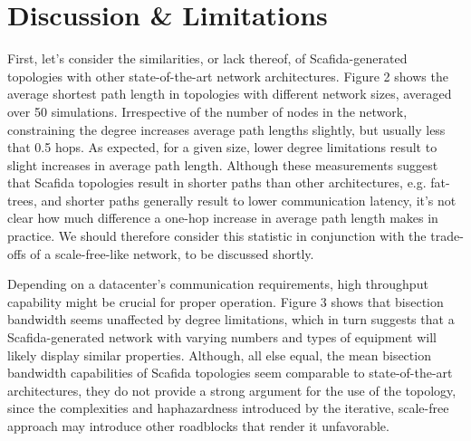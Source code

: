 \section{Discussion \& Limitations}
First, let's consider the similarities, or lack thereof, of Scafida-generated topologies with other state-of-the-art network architectures. Figure 2 shows the average shortest path length in topologies with different network sizes, averaged over 50 simulations. Irrespective of the number of nodes in the network, constraining the degree increases average path lengths slightly, but usually less that 0.5 hops. As expected, for a given size, lower degree limitations result to slight increases in average path length. Although these measurements suggest that Scafida topologies result in shorter paths than other architectures, e.g. fat-trees, and shorter paths generally result to lower communication latency, it's not clear how much difference a one-hop increase in average path length makes in practice. We should therefore consider this statistic in conjunction with the trade-offs of a scale-free-like network, to be discussed shortly.

Depending on a datacenter's communication requirements, high throughput capability might be crucial for proper operation. Figure 3 shows that bisection bandwidth seems unaffected by degree limitations, which in turn suggests that a Scafida-generated network with varying numbers and types of equipment will likely display similar properties. Although, all else equal, the mean bisection bandwidth capabilities of Scafida topologies seem comparable to state-of-the-art architectures, they do not provide a strong argument for the use of the topology, since the complexities and haphazardness introduced by the iterative, scale-free approach may introduce other roadblocks that render it unfavorable.

